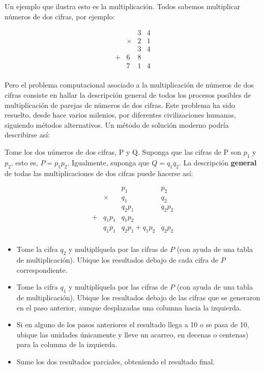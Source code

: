 Un ejemplo que ilustra esto es la multiplicación. Todos sabemos multiplicar 
números de dos cifras, por ejemplo:

 \[
 \begin{array}{cccc}
           \ &\ &3&4\\
           \ & \times&2&1 \\ \hline
           \ &\ &3&4 \\
            +&6&8&\ \\  \hline
           \ &7&1&4 \\
 \end{array}
\]

Pero el problema computacional asociado a la multiplicación de números de dos
cifras consiste en hallar la descripción general de todos los procesos posibles
de multiplicación de parejas de números de dos cifras. Este problema ha sido
resuelto, desde hace varios milenios, por diferentes civilizaciones humanas,
siguiendo métodos alternativos. Un método de solución moderno podría describirse
así:

Tome los dos números de dos cifras, P y Q. Suponga que las cifras de P son 
$p_1$ y $p_2$, esto es, $P=p_1p_2$. Igualmente, suponga que $Q=q_1q_2$. La 
descripción {\bf general} de todas las multiplicaciones de dos cifras puede 
hacerse así:

\[
  \begin{array}{cccc}
           \ &\ &p_1&p_2\\
           \ & \times&q_1&q_2 \\ \hline
           \ &\ &q_2p_1&q_2p_2 \\
            +&q_1p_1&q_1p_2&\ \\  \hline
           \ &q_1p_1&q_2p_1+q_1p_2&q_2p_2 \\
  \end{array}
\]

\begin{itemize}
	\item Tome la cifra $q_2$ y multiplíquela por las cifras de  $P$ (con ayuda 
	de una tabla de multiplicación). 
	Ubique los resultados debajo de cada cifra de $P$ correspondiente. 
	
	\item Tome la cifra $q_1$ y multiplíquela por las cifras de  $P$ (con ayuda 
	de una tabla de multiplicación). 
	Ubique los resultados debajo de las cifras que se generaron en el paso 
	anterior, aunque desplazadas una columna hacia la izquierda.
	
	\item Si en alguno de los pasos anteriores el resultado llega a 10 o se 
	pasa de 10, ubique las unidades únicamente 
	y lleve un acarreo, en decenas o centenas) para la columna de la izquierda.
	
	\item Sume los dos resultados parciales, obteniendo el resultado final.
\end{itemize}

